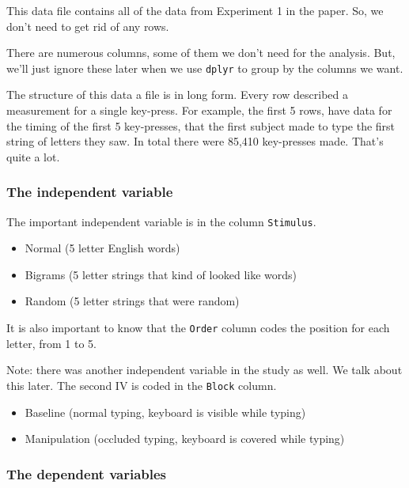 \documentclass[
]{book}
\providecommand{\tightlist}{%
  \setlength{\itemsep}{0pt}\setlength{\parskip}{0pt}}
\begin{document}
This data file contains all of the data from Experiment 1 in the paper. So, we don't need to get rid of any rows.

There are numerous columns, some of them we don't need for the analysis. But, we'll just ignore these later when we use \texttt{dplyr} to group by the columns we want.

The structure of this data a file is in long form. Every row described a measurement for a single key-press. For example, the first 5 rows, have data for the timing of the first 5 key-presses, that the first subject made to type the first string of letters they saw. In total there were 85,410 key-presses made. That's quite a lot.

\hypertarget{the-independent-variable-1}{%
\subsubsection{The independent variable}\label{the-independent-variable-1}}

The important independent variable is in the column \texttt{Stimulus}.

\begin{itemize}
\tightlist
\item
  Normal (5 letter English words)
\item
  Bigrams (5 letter strings that kind of looked like words)
\item
  Random (5 letter strings that were random)
\end{itemize}

It is also important to know that the \texttt{Order} column codes the position for each letter, from 1 to 5.

Note: there was another independent variable in the study as well. We talk about this later. The second IV is coded in the \texttt{Block} column.

\begin{itemize}
\tightlist
\item
  Baseline (normal typing, keyboard is visible while typing)
\item
  Manipulation (occluded typing, keyboard is covered while typing)
\end{itemize}

\hypertarget{the-dependent-variables}{%
\subsubsection{The dependent variables}\label{the-dependent-variables}}
\end{document}
